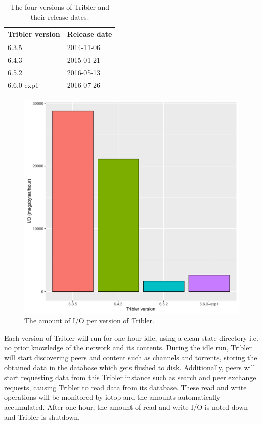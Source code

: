 \begin{table}[h]
	\centering
	\caption{The four versions of Tribler and their release dates.}
	\label{table:tribler_version_dates}
	\begin{tabular}{l|l}
		\textbf{Tribler version} & \textbf{Release date} \\ \hline
		6.3.5           & 2014-11-06   \\ 
		6.4.3           & 2015-01-21   \\ 
		6.5.2           & 2016-05-13   \\ 
		6.6.0-exp1      & 2016-07-26   \\ 
	\end{tabular}
\end{table}

\begin{figure}[!h]
	\centering
	\includegraphics[width=\linewidth]{experimentation/images/io_history}
	\caption{The amount of I/O per version of Tribler.}
	\label{fig:io_history}
\end{figure} 

Each version of Tribler will run for one hour idle, using a clean state directory i.e. no prior knowledge of the network and its contents.
During the idle run, Tribler will start discovering peers and content such as channels and torrents, storing the obtained data in the database which gets flushed to disk.
Additionally, peers will start requesting data from this Tribler instance such as search and peer exchange requests, causing Tribler to read data from its database.
These read and write operations will be monitored by iotop and the amounts automatically accumulated.
After one hour, the amount of read and write I/O is noted down and Tribler is shutdown.

